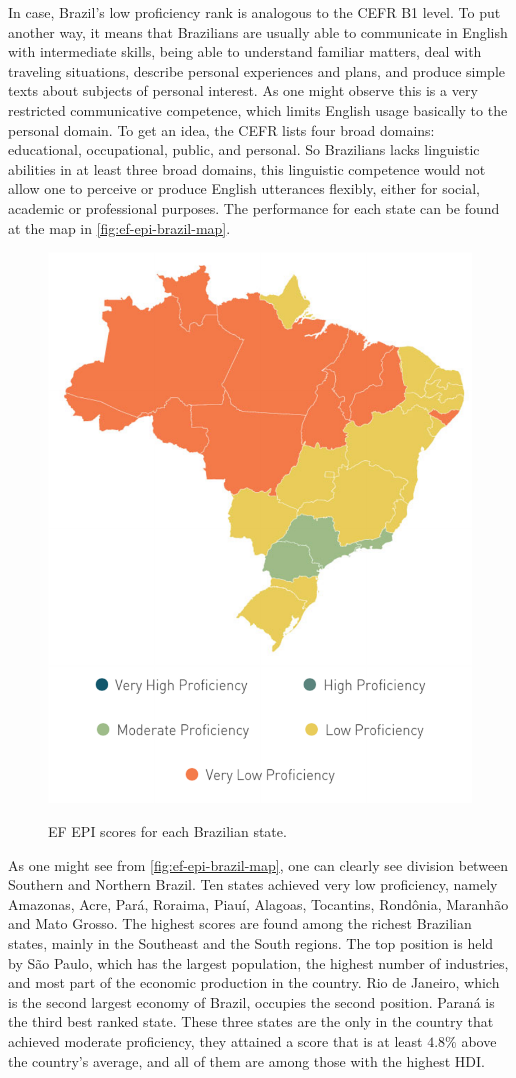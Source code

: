 In case, Brazil's low proficiency rank is analogous to the \ac{CEFR} B1 level. To put another way, it means that Brazilians are usually able to communicate in English with intermediate skills, being able to understand familiar matters, deal with traveling situations, describe personal experiences and plans, and produce simple texts about subjects of personal interest. As one might observe this is a very restricted communicative competence, which limits English usage basically to the personal domain. To get an idea, the \ac{CEFR} lists four broad domains: educational, occupational, public, and personal. So Brazilians lacks linguistic abilities in at least three broad domains, this linguistic competence would not allow one to perceive or produce English utterances flexibly, either for social, academic or professional purposes. The performance for each state can be found at the map in \autoref{fig:ef-epi-brazil-map}.

\begin{figure}[!ht]
  \centering
  {\includegraphics[width=.6\linewidth]{gfx/ef-epi-brazil-map.pdf}}
  \caption{EF EPI scores for each Brazilian state.}
  \label{fig:ef-epi-brazil-map}
\end{figure}

As one might see from \autoref{fig:ef-epi-brazil-map}, one can clearly see division between Southern and Northern Brazil. Ten states achieved very low proficiency, namely Amazonas, Acre, Par\'a, Roraima, Piau\'i, Alagoas, Tocantins, Rond\^onia, Maranh\~ao and Mato Grosso. The highest scores are found among the richest Brazilian states, mainly in the Southeast and the South regions. The top position is held by S\~ao Paulo, which has the largest population, the highest number of industries, and most part of the economic production in the country. Rio de Janeiro, which is the second largest economy of Brazil, occupies the second position. Paran\'a is the third best ranked state. These three states are the only in the country that achieved moderate proficiency, they attained a score that is at least $4.8\%$ above the country's average, and all of them are among those with the highest \ac{HDI}.

